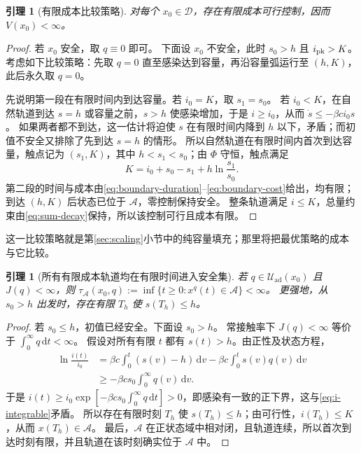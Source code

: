 \documentclass[11pt,a4paper,UTF8]{ctexart}
\newtheorem{lemma}[theorem]{引理}
\theoremstyle{definition}
\newcommand{\Acal}{\mathcal A}
\newcommand{\Dcal}{\mathcal D}
\newcommand{\Uad}{\mathcal U_{\mathrm{ad}}}
\newcommand{\dd}{\,\mathrm d}
\begin{document}
\begin{lemma}[有限成本比较策略]
\label{lem:finite-feasible}
对每个 $x_0\in\Dcal$，存在有限成本可行控制，因而 $V(x_0)<\infty$。
\end{lemma}
\begin{proof}
若 $x_0$ 安全，取 $q\equiv0$ 即可。
下面设 $x_0$ 不安全，此时 $s_0>h$ 且 $i_{\rm pk}>K$。
考虑如下比较策略：先取 $q=0$ 直至感染达到容量，再沿容量弧运行至 $(h,K)$，此后永久取 $q=0$。

先说明第一段在有限时间内到达容量。若 $i_0=K$，取 $s_1=s_0$。
若 $i_0<K$，在自然轨道到达 $s=h$ 或容量之前，$s>h$ 使感染增加，于是 $i\ge i_0$，从而 $\dot s\le-\beta ci_0s$。
如果两者都不到达，这一估计将迫使 $s$ 在有限时间内降到 $h$ 以下，矛盾；而初值不安全又排除了先到达 $s=h$ 的情形。
所以自然轨道在有限时间内首次到达容量，触点记为 $(s_1,K)$，其中 $h<s_1<s_0$；由 $\Phi$ 守恒，触点满足
\begin{equation}
K=i_0+s_0-s_1+h\ln\frac{s_1}{s_0}.
\label{eq:s1}
\end{equation}
第二段的时间与成本由\eqref{eq:boundary-duration}--\eqref{eq:boundary-cost}给出，均有限；到达 $(h,K)$ 后状态已位于 $\Acal$，零控制保持安全。
整条轨道满足 $i\le K$，总量约束由\eqref{eq:sum-decay}保持，所以该控制可行且成本有限。
\end{proof}
这一比较策略就是第\ref{sec:scaling}小节中的纯容量填充；那里将把最优策略的成本与它比较。

\begin{lemma}[所有有限成本轨道均在有限时间进入安全集]
\label{lem:finite-entry}
若 $q\in\Uad(x_0)$ 且 $J(q)<\infty$，则
$\tau_{\Acal}(x_0,q):=\inf\{t\ge0:x^q(t)\in\Acal\}<\infty$。
更强地，从 $s_0>h$ 出发时，存在有限 $T_h$ 使 $s(T_h)\le h$。
\end{lemma}
\begin{proof}
若 $s_0\le h$，初值已经安全。下面设 $s_0>h$。
常接触率下 $J(q)<\infty$ 等价于 $\int_0^\infty q\dd t<\infty$。
假设对所有有限 $t$ 都有 $s(t)>h$。由正性及状态方程，
\begin{align*}
\ln\frac{i(t)}{i_0}
&=\beta c\int_0^t(s(v)-h)\dd v-\beta c\int_0^t s(v)q(v)\dd v\\
&\ge-\beta cs_0\int_0^\infty q(v)\dd v.
\end{align*}
于是 $i(t)\ge i_0\exp[-\beta cs_0\int_0^\infty q\dd t]>0$，即感染有一致的正下界，这与\eqref{eq:i-integrable}矛盾。
所以存在有限时刻 $T_h$ 使 $s(T_h)\le h$；由可行性，$i(T_h)\le K$，从而 $x(T_h)\in\Acal$。
最后，$\Acal$ 在正状态域中相对闭，且轨道连续，所以首次到达时刻有限，并且轨道在该时刻确实位于 $\Acal$ 中。
\end{proof}
\end{document}
